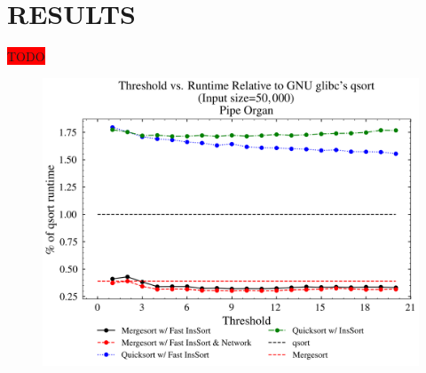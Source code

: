 \documentclass[12pt, conference]{ieeeconf}
\newcommand{\todo}{\colorbox{red}{TODO}}
\begin{document}
\section{RESULTS}

\todo

\begin{figure}[H]
	\centering
	\label{fig:random}
\end{figure}
\begin{figure}[H]
	\centering
	\includegraphics[width=\columnwidth]{pipe_organ}
	\label{fig:pipe_organ}
\end{figure}
\end{document}
